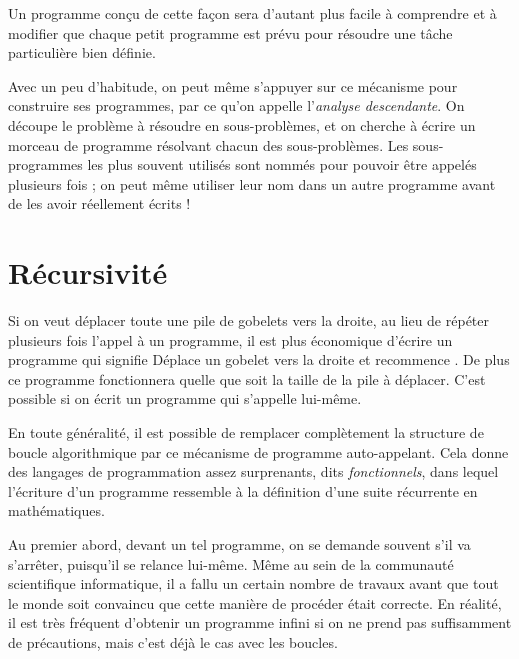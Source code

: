 \documentclass[a4paper,12pt,fleqn]{article}
\begin{document}
\medskip

Un programme conçu de cette façon sera d'autant plus facile à
comprendre et à modifier que chaque petit programme est prévu pour
résoudre une tâche particulière bien définie.

Avec un peu d'habitude, on peut même s'appuyer sur ce mécanisme pour
construire ses programmes, par ce qu'on appelle l'\emph{analyse
descendante}. On découpe le problème à résoudre en sous-problèmes,
et on cherche à écrire un morceau de programme 
résolvant chacun des sous-problèmes. Les sous-programmes les plus
souvent utilisés sont nommés pour pouvoir être appelés plusieurs fois
; on peut même utiliser leur nom dans un autre programme avant de les
avoir réellement écrits !


\section*{Récursivité}

Si on veut déplacer toute une pile de gobelets vers la droite, au lieu de
r\'ep\'eter plusieurs fois l'appel à un programme, il est plus
\'economique d'\'ecrire un programme qui signifie
\og Déplace un gobelet vers la droite et recommence \fg{}. De plus ce
programme fonctionnera quelle que soit la taille de la pile à
déplacer. C'est possible si on écrit un programme qui s'appelle lui-m\^eme.

En toute généralité, il est possible de remplacer complètement la
structure de boucle algorithmique par ce mécanisme de programme
auto-appelant. Cela donne des langages de programmation assez
surprenants, dits \emph{fonctionnels}, dans lequel l'écriture d'un
programme ressemble à la définition d'une suite récurrente en mathématiques.

\medskip

Au premier abord, devant un tel programme, on se demande souvent s'il
va s'arrêter, puisqu'il se relance lui-même. Même au sein de la
communauté scientifique informatique, il a fallu un certain nombre de
travaux avant que tout le monde soit convaincu que cette manière de
procéder était correcte. En réalité, il est très fréquent d'obtenir
un programme infini si on ne prend pas suffisamment de précautions,
mais c'est déjà le cas avec les boucles.
\end{document}
